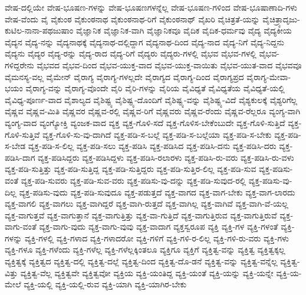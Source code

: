{ವೇಷ-ದಲ್ಲಿಯೇ
ವೇಷ-ಭೂಷಣ-ಗಳನ್ನು
ವೇಷ-ಭೂಷಣಗಳನ್ನೆಲ್ಲ
ವೇಷ-ಭೂಷಣ-ಗಳಿಂದ
ವೇಷ-ಭೂಷಾಣಾದಿ-ಗಳು
ವೇಷ-ವೆಂದು
ವೈ
ವೈಕುಂಠ
ವೈಕುಂಠನಾಥ
ವೈಕುಂಠನಾಥ-ರಿಗೆ
ವೈಕುಂಠನಾಥ್
ವೈಖರಿ
ವೈಚಿತ್ರತೆ-ಯನ್ನು
ವೈಚಿತ್ರ್ಯಾದೃಜು-ಕುಟಿಲ-ನಾನಾ-ಪಥಜುಷಾಂ
ವೈಜ್ಞಾನಿಕ
ವೈಜ್ಞಾನಿಕ-ವಾಗಿ
ವೈಜ್ಞಾನಿಕವೂ
ವೈದಿಕ
ವೈದಿಕ-ಧರ್ಮವು
ವೈದ್ಯ
ವೈದ್ಯಕೀಯ
ವೈದ್ಯನ
ವೈದ್ಯ-ನನ್ನು
ವೈದ್ಯನಾಥಕ್ಕೆ
ವೈದ್ಯನಾಥ-ದಲ್ಲಿದ್ದಾಗ
ವೈದ್ಯನಾಥ-ದಿಂದ
ವೈದ್ಯ-ನಾದ
ವೈದ್ಯ-ನಿಗೆ
ವೈದ್ಯ-ನಿದ್ದನು
ವೈದ್ಯನು
ವೈದ್ಯರ
ವೈದ್ಯ-ರನ್ನು
ವೈದ್ಯ-ರಾದ
ವೈದ್ಯ-ರಿಗೆ
ವೈದ್ಯರು
ವೈದ್ಯರು-ಗಳಲ್ಲಿ
ವೈಭವ
ವೈಭವ-ಗಳಲ್ಲಿ
ವೈಭವ-ಗಳಿದ್ದರೇನು
ವೈಭವದ
ವೈಭವ-ದಿಂದ
ವೈಭವ-ಯುಕ್ತ-ವಾದ
ವೈಭವ-ಯುಕ್ತ-ವಾಯಿತು
ವೈಭವ-ಯುತ-ವಾದ
ವೈಭವವೂ
ವೈಮನಸ್ಯ-ವಲ್ಲ
ವೈಮೇನ್
ವೈರಾಗ್ಯ
ವೈರಾಗ್ಯ-ಗಳಲ್ಲದೇ
ವೈರಾಗ್ಯದ
ವೈರಾಗ್ಯ-ದಿಂದ
ವೈರಾಗ್ಯಪ್ರದ
ವೈರಾಗ್ಯ-ಮೇವಾ-ಭಯಂ
ವೈರಾಗ್ಯ-ವನ್ನು
ವೈರಾಗ್ಯ-ವೊಂದೇ
ವೈರಿ
ವೈರಿ-ಗಳನ್ನು
ವೈರಿಯ
ವೈವಿಧ್ಯತೆ
ವೈವಿಧ್ಯತೆಯ
ವೈವಿಧ್ಯತೆ-ಯಲ್ಲಿ
ವೈವಿಧ್ಯ-ಪೂರ್ಣ-ವಾದ
ವೈಶಾಲ್ಯದ
ವೈಶಿಷ್ಟ್ಯ
ವೈಶಿಷ್ಟ್ಯ-ದೊಂದಿಗೆ
ವೈಶಿಷ್ಟ್ಯ-ವನ್ನು
ವೈಶಿಷ್ಟ್ಯ-ವಿದೆ
ವೈಶ್ಯಕುಲಕ್ಕೆ
ವೈಶ್ಯರಿಗೆಲ್ಲ
ವೈಷ್ಣವ
ವೈಷ್ಣವ-ಮಿತಿ
ವೈಷ್ಣವರ
ವೈಷ್ಣವ-ರಲ್ಲಿ
ವೈಷ್ಣವ-ರಿಗೆ
ವೈಷ್ಣವರು
ವೈಷ್ಣವ-ರೆಂದು
ವೈಷ್ಣವ-ರೆಲ್ಲರೂ
ವ್ಯಂಗ್ಯ-ವಾಗಿ
ವ್ಯಂಗ್ಯ-ವಾದ
ವ್ಯಂಗ್ಯೋಕ್ತಿ
ವ್ಯಂಜಕ-ವಾದ
ವ್ಯಕ್ತ
ವ್ಯಕ್ತ-ಗೊಳಿ-ಸದೆ
ವ್ಯಕ್ತ-ಗೊಳಿಸ-ಬೇಕೆಂಬುದೇ
ವ್ಯಕ್ತ-ಗೊಳಿ-ಸುತ್ತಿದೆ
ವ್ಯಕ್ತ-ಗೊಳಿ-ಸುತ್ತಿವೆ
ವ್ಯಕ್ತ-ಗೊಳಿ-ಸು-ವು-ದಾಗಿದೆ
ವ್ಯಕ್ತ-ಪಡಿ-ಸ-ಬಲ್ಲೆ
ವ್ಯಕ್ತ-ಪಡಿ-ಸ-ಬಲ್ಲೆಯಾ
ವ್ಯಕ್ತ-ಪಡಿ-ಸ-ಬೇಕು
ವ್ಯಕ್ತ-ಪಡಿ-ಸ-ಬೇಡ
ವ್ಯಕ್ತ-ಪಡಿ-ಸ-ಲಿಲ್ಲ
ವ್ಯಕ್ತ-ಪಡಿ-ಸಲು
ವ್ಯಕ್ತ-ಪಡಿಸಿ
ವ್ಯಕ್ತ-ಪಡಿಸಿದ
ವ್ಯಕ್ತ-ಪಡಿಸಿ-ದನು
ವ್ಯಕ್ತ-ಪಡಿಸಿ-ದರು
ವ್ಯಕ್ತ-ಪಡಿಸಿ-ದಾಗ
ವ್ಯಕ್ತ-ಪಡಿಸಿದ್ದರು
ವ್ಯಕ್ತ-ಪಡಿಸಿದ್ದಳು
ವ್ಯಕ್ತ-ಪಡಿಸಿ-ರಲಾರಳು
ವ್ಯಕ್ತ-ಪಡಿಸಿ-ರು-ವರು
ವ್ಯಕ್ತ-ಪಡಿಸಿ-ರು-ವಳು
ವ್ಯಕ್ತ-ಪಡಿ-ಸುತ್ತಿತ್ತು
ವ್ಯಕ್ತ-ಪಡಿ-ಸುತ್ತಿದ್ದ
ವ್ಯಕ್ತ-ಪಡಿ-ಸುತ್ತಿದ್ದರು
ವ್ಯಕ್ತ-ಪಡಿ-ಸುತ್ತಿರ-ಲಿಲ್ಲ
ವ್ಯಕ್ತ-ಪಡಿ-ಸುವ
ವ್ಯಕ್ತ-ಪಡಿಸು-ವಂತೆ
ವ್ಯಕ್ತ-ಪಡಿ-ಸುವರು
ವ್ಯಕ್ತ-ಪಡಿ-ಸುವ-ವರು
ವ್ಯಕ್ತ-ಪಡಿಸು-ವು-ದನ್ನು
ವ್ಯಕ್ತ-ಪಡಿ-ಸುವುದ-ರಲ್ಲಿ
ವ್ಯಕ್ತ-ಪಡಿಸು-ವು-ದಿಲ್ಲ
ವ್ಯಕ್ತ-ಪಡಿಸು-ವುದು
ವ್ಯಕ್ತ-ಪಡಿ-ಸುವುದೂ
ವ್ಯಕ್ತ-ಪಡುತ್ತದೆ
ವ್ಯಕ್ತ-ವಾಗದ
ವ್ಯಕ್ತ-ವಾಗ-ಬೇಕು
ವ್ಯಕ್ತ-ವಾಗ-ಲಾರದು
ವ್ಯಕ್ತ-ವಾಗಲಿ
ವ್ಯಕ್ತ-ವಾಗಲು
ವ್ಯಕ್ತ-ವಾಗಿದ್ದರೆ
ವ್ಯಕ್ತ-ವಾಗಿ-ರುತ್ತದೆ
ವ್ಯಕ್ತ-ವಾಗಿಲ್ಲ
ವ್ಯಕ್ತ-ವಾಗಿವೆ
ವ್ಯಕ್ತ-ವಾಗಿ-ವೆ-ಯಲ್ಲ
ವ್ಯಕ್ತ-ವಾಗುತ್ತವೆ
ವ್ಯಕ್ತ-ವಾಗುತ್ತಾನೆ
ವ್ಯಕ್ತ-ವಾಗುತ್ತಿತ್ತು
ವ್ಯಕ್ತ-ವಾ-ಗುತ್ತಿದೆ
ವ್ಯಕ್ತ-ವಾಗುತ್ತಿರುವ
ವ್ಯಕ್ತ-ವಾಗುತ್ತಿರುವೆ
ವ್ಯಕ್ತ-ವಾಗು-ವಂತೆ
ವ್ಯಕ್ತ-ವಾಗು-ವುದು
ವ್ಯಕ್ತ-ವಾಗು-ವುವು
ವ್ಯಕ್ತ-ವಾದಾಗ
ವ್ಯಕ್ತಸ್ವರೂಪ
ವ್ಯಕ್ತಿ
ವ್ಯಕ್ತಿ-ಗಳ
ವ್ಯಕ್ತಿ-ಗಳಂತೆ
ವ್ಯಕ್ತಿ-ಗಳನ್ನು
ವ್ಯಕ್ತಿ-ಗಳಲ್ಲಿ
ವ್ಯಕ್ತಿ-ಗಳಾದ
ವ್ಯಕ್ತಿ-ಗಳಾದರೋ
ವ್ಯಕ್ತಿ-ಗಳಿಗೆ
ವ್ಯಕ್ತಿ-ಗಳಿ-ರ-ಲಿಲ್ಲ
ವ್ಯಕ್ತಿ-ಗಳಿ-ರು-ವರು
ವ್ಯಕ್ತಿ-ಗಳು
ವ್ಯಕ್ತಿ-ಗಳೂ
ವ್ಯಕ್ತಿ-ಗಳೆಂದು
ವ್ಯಕ್ತಿ-ಗಳೆಲ್ಲ
ವ್ಯಕ್ತಿ-ಗಳೆಲ್ಲಕ್ಕಿಂತಲೂ
ವ್ಯಕ್ತಿಗೂ
ವ್ಯಕ್ತಿಗೆ
ವ್ಯಕ್ತಿತ್ವ-ವನ್ನು
ವ್ಯಕ್ತಿತ್ವ
ವ್ಯಕ್ತಿತ್ವಕ್ಕಲ್ಲ
ವ್ಯಕ್ತಿತ್ವಕ್ಕೆ
ವ್ಯಕ್ತಿತ್ವದ
ವ್ಯಕ್ತಿತ್ವ-ದಲ್ಲಿ
ವ್ಯಕ್ತಿತ್ವ-ದಲ್ಲೆ
ವ್ಯಕ್ತಿತ್ವ-ದಿಂದ
ವ್ಯಕ್ತಿತ್ವ-ದೊ-ಡನೆ
ವ್ಯಕ್ತಿತ್ವ-ವನ್ನು
ವ್ಯಕ್ತಿತ್ವ-ವನ್ನೆಲ್ಲ
ವ್ಯಕ್ತಿತ್ವ-ವಿತ್ತು
ವ್ಯಕ್ತಿತ್ವ-ವೆಲ್ಲ
ವ್ಯಕ್ತಿತ್ವವೇ
ವ್ಯಕ್ತಿತ್ವವೋ
ವ್ಯಕ್ತಿಯ
ವ್ಯಕ್ತಿ-ಯಂತಿದ್ದ
ವ್ಯಕ್ತಿ-ಯಂತೆ
ವ್ಯಕ್ತಿ-ಯನ್ನು
ವ್ಯಕ್ತಿ-ಯನ್ನೇ
ವ್ಯಕ್ತಿ-ಯ-ಮೇಲೆ
ವ್ಯಕ್ತಿ-ಯಲ್ಲಿ
ವ್ಯಕ್ತಿ-ಯಲ್ಲಿ-ರುವ
ವ್ಯಕ್ತಿ-ಯಾಗಿ
ವ್ಯಕ್ತಿ-ಯಾಗಿರ-ಬೇಕು
}
